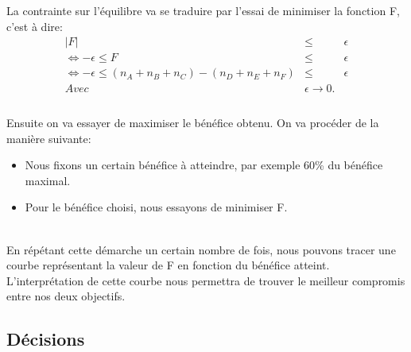 La contrainte sur l'équilibre va se traduire par l'essai de minimiser la
fonction F, c'est à dire:
\begin{eqnarray*}
	|F| &\leq& \epsilon\\
	\Leftrightarrow -\epsilon \leq F &\leq& \epsilon\\
	\Leftrightarrow -\epsilon \leq (n_A+n_B+n_C)-(n_D+n_E+n_F)
	&\leq& \epsilon\\
	Avec& \epsilon \rightarrow 0.\\
\end{eqnarray*} 
~\\
Ensuite on va essayer de maximiser le bénéfice obtenu. 
On va procéder de la manière suivante:  
\begin{itemize}
   \item Nous fixons un certain bénéfice à atteindre, par
	     exemple 60\% du bénéfice maximal.
   \item Pour le bénéfice choisi, nous essayons de minimiser F. 
\end{itemize}
~\\
En répétant cette démarche un certain nombre de fois, nous pouvons tracer une
courbe représentant la valeur de F en fonction du bénéfice atteint. 
L'interprétation de cette courbe nous permettra de trouver le meilleur
compromis entre nos deux objectifs.

\subsection{Décisions}

